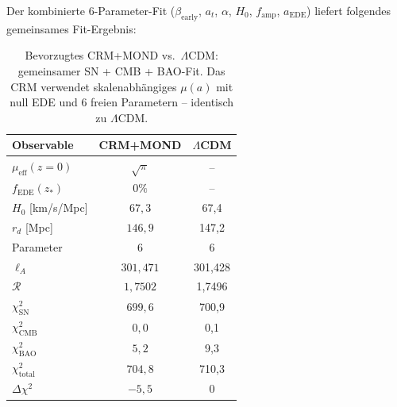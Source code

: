 \documentclass[aps,prd,twocolumn,superscriptaddress,nofootinbib,floatfix]{revtex4-2}
\begin{document}
Der kombinierte 6-Parameter-Fit ($\beta_{\mathrm{early}}$, $a_t$, $\alpha$, $H_0$, $f_{\mathrm{amp}}$, $a_{\mathrm{EDE}}$) liefert folgendes gemeinsames Fit-Ergebnis:

\begin{table}[t]
\centering
\caption{Bevorzugtes CRM+MOND vs.\ $\Lambda$CDM: gemeinsamer SN + CMB + BAO-Fit. Das CRM verwendet skalenabhängiges $\mu(a)$ mit null EDE und 6 freien Parametern -- identisch zu $\Lambda$CDM.}
\label{tab:combined_fit}
\begin{tabular}{lcc}
\toprule
\textbf{Observable} & \textbf{CRM+MOND} & \textbf{$\Lambda$CDM} \\
\midrule
$\mu_{\mathrm{eff}}(z{=}0)$ & $\sqrt{\pi}$ & -- \\
$f_{\mathrm{EDE}}(z_*)$ & $0\%$ & -- \\
$H_0$ [km/s/Mpc] & $67{,}3$ & 67,4 \\
$r_d$ [Mpc] & $146{,}9$ & 147,2 \\
Parameter & $6$ & 6 \\
\midrule
$\ell_A$ & $301{,}471$ & 301,428 \\
$\mathcal{R}$ & $1{,}7502$ & 1,7496 \\
\midrule
$\chi^2_{\mathrm{SN}}$ & $699{,}6$ & 700,9 \\
$\chi^2_{\mathrm{CMB}}$ & $0{,}0$ & 0,1 \\
$\chi^2_{\mathrm{BAO}}$ & $5{,}2$ & 9,3 \\
\midrule
$\chi^2_{\mathrm{total}}$ & $704{,}8$ & 710,3 \\
$\Delta\chi^2$ & $-5{,}5$ & 0 \\
\bottomrule
\end{tabular}
\end{table}
\end{document}

